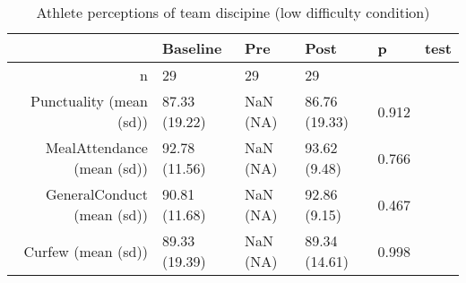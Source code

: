 \begin{table}[ht]
\centering
\begin{tabular}{rlllll}
  \hline
 & Baseline & Pre & Post & p & test \\ 
  \hline
n &    29 &  29 &    29 &  &  \\ 
  Punctuality (mean (sd)) & 87.33 (19.22) & NaN (NA) & 86.76 (19.33) &  0.912 &  \\ 
  MealAttendance (mean (sd)) & 92.78 (11.56) & NaN (NA) & 93.62 (9.48) &  0.766 &  \\ 
  GeneralConduct (mean (sd)) & 90.81 (11.68) & NaN (NA) & 92.86 (9.15) &  0.467 &  \\ 
  Curfew (mean (sd)) & 89.33 (19.39) & NaN (NA) & 89.34 (14.61) &  0.998 &  \\ 
   \hline
\end{tabular}
\caption{Athlete perceptions of 
 team discipine (low difficulty condition)} 
\end{table}
